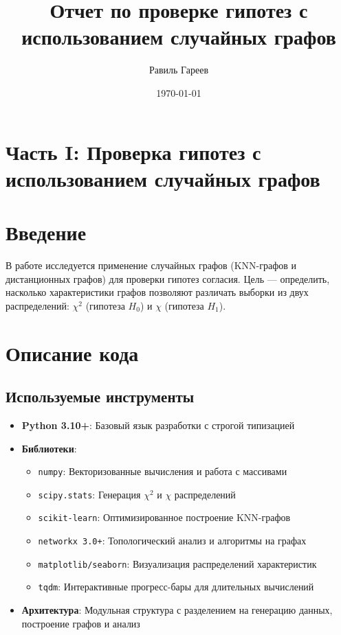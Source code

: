 \documentclass[a4paper, 12pt]{article}
\title{Отчет по проверке гипотез с использованием случайных графов}
\author{Равиль Гареев}
\date{\today}
\begin{document}
\maketitle

\section*{Часть I: Проверка гипотез с использованием случайных графов}

\section*{Введение}
В работе исследуется применение случайных графов (KNN-графов и дистанционных графов) для проверки гипотез согласия. 
Цель — определить, насколько характеристики графов позволяют различать выборки из двух распределений: \(\chi^2\) (гипотеза \(H_0\)) и \(\chi\) (гипотеза \(H_1\)).

\section{Описание кода}

\subsection{Используемые инструменты}
\begin{itemize}
    \item \textbf{Python 3.10+}: Базовый язык разработки с строгой типизацией
    \item \textbf{Библиотеки}:
    \begin{itemize}[leftmargin=*]
        \item \texttt{numpy}: Векторизованные вычисления и работа с массивами
        \item \texttt{scipy.stats}: Генерация $\chi^2$ и $\chi$ распределений
        \item \texttt{scikit-learn}: Оптимизированное построение KNN-графов
        \item \texttt{networkx 3.0+}: Топологический анализ и алгоритмы на графах
        \item \texttt{matplotlib/seaborn}: Визуализация распределений характеристик
        \item \texttt{tqdm}: Интерактивные прогресс-бары для длительных вычислений
    \end{itemize}
    \item \textbf{Архитектура}: Модульная структура с разделением на генерацию данных, построение графов и анализ
\end{itemize}
\end{document}
